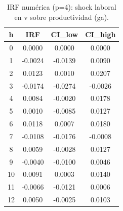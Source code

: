 \begin{table}[htbp]
\centering
\caption{IRF numérica (p=4): shock laboral en v sobre productividad (ga).}
\label{tab_irf_v_ga_p4}
\footnotesize
\begin{tabular}{cccc}
\toprule
h & IRF & CI_low & CI_high \\
\midrule
 0 & 0.0000 & 0.0000 & 0.0000 \\
 1 & -0.0024 & -0.0139 & 0.0090 \\
 2 & 0.0123 & 0.0010 & 0.0207 \\
 3 & -0.0174 & -0.0274 & -0.0026 \\
 4 & 0.0084 & -0.0020 & 0.0178 \\
 5 & 0.0010 & -0.0085 & 0.0127 \\
 6 & 0.0118 & 0.0007 & 0.0180 \\
 7 & -0.0108 & -0.0176 & -0.0008 \\
 8 & 0.0059 & -0.0028 & 0.0127 \\
 9 & -0.0040 & -0.0100 & 0.0046 \\
10 & 0.0091 & 0.0003 & 0.0140 \\
11 & -0.0066 & -0.0121 & 0.0006 \\
12 & 0.0050 & -0.0025 & 0.0103 \\
\bottomrule
\end{tabular}
\end{table}


